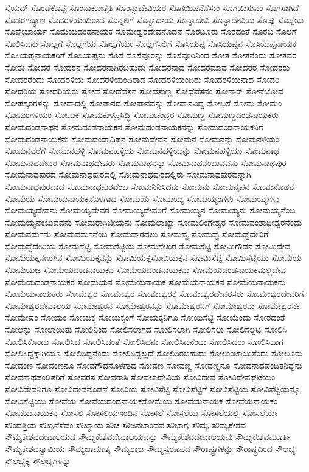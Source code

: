 {ಸೈಯದ್
ಸೊಂಡೆಕೊಪ್ಪ
ಸೊಂನಾಕೋತ್ಸತಿ
ಸೊಂನ್ನಾದೇವಿಯರ
ಸೊಗಯಿಪನೆನೆಸುಂ
ಸೊಗಯಿಸುವಂ
ಸೊಗಸಾಗಿದೆ
ಸೊಡರಗದ್ಯಾಣ
ಸೊದರಳಿಯಂದಿರಾದ
ಸೊನ್ನಲಿಗೆ
ಸೊನ್ನಾದಾಯ
ಸೊನ್ನಾದೇವಿ
ಸೊನ್ನಾದೇವಿಯ
ಸೊಪ್ಪು
ಸೊಪ್ಪೆಯ
ಸೊಪ್ಪೆಯಾರ್ಯ
ಸೊಮೆಯದಂಡನಾಯಕ
ಸೊಮೇಶ್ವರದೇವನೊಡನೆ
ಸೊರಟೂರು
ಸೊರದಂತೆ
ಸೊರಬ
ಸೊಲಗೆ
ಸೊಲಿಸಿದನು
ಸೊಲ್ಲಗೆ
ಸೊಲ್ಲಗೆಯ
ಸೊಲ್ಲಗೆಯೇ
ಸೊಲ್ಲಗೆಸಲಿಗೆ
ಸೊಸಿಯಪ್ಪ
ಸೊಸಿಯಪ್ಪನ
ಸೊಸಿಯಪ್ಪನಾಯಕ
ಸೊಸಿಯಪ್ಪನಾಯಕರಿಗೆ
ಸೊಸಿಯಪ್ಪನು
ಸೊಸೆ
ಸೊಸೆವೂರನ್ನು
ಸೊಸೆವೂರಿನಿಂದ
ಸೋತ
ಸೋತನೆಂದು
ಸೋತವರ
ಸೋತು
ಸೋದರ
ಸೋದರನ
ಸೋದರನಾಗಿರಬಹುದು
ಸೋದರನಾದ
ಸೋದರಮಾವ
ಸೋದರರ
ಸೋದರರು
ಸೋದರರೆಂದು
ಸೋದರಳಿಯ
ಸೋದರಳಿಯಂದಿರಾದ
ಸೋದರಳಿಯಂದಿರು
ಸೋದರಳಿಯನಾದ
ಸೋದರಿ
ಸೋದರಿಯ
ಸೋದರಿಯರು
ಸೋದೆ
ಸೋದೆವೆಸನ
ಸೋದೆಸುಣ್ಣ
ಸೋಧೆವೆಸನಂ
ಸೋನಾರ್
ಸೋನೆಬೋವ
ಸೋಪಸ್ಕರಗಳನ್ನು
ಸೋಪಾದಲ್ಲಿ
ಸೋಪಾನದ
ಸೋಪಾನವನ್ನು
ಸೋಪಾನವಿದ್ದ
ಸೋಭಿಸೆ
ಸೋಮ
ಸೋಮಂ
ಸೋಮಂಗಳಿಯಂ
ಸೋಮಕ
ಸೋಮಕುಳಪ್ರಸಿದ್ಧಿ
ಸೋಮಚಂದ್ರರ
ಸೋಮಣ್ಣ
ಸೋಮಣ್ಣದಂಡನಾಯಕರು
ಸೋಮದಂಡನಾಥನ
ಸೋಮದಂಡನಾಯಕನ
ಸೋಮದಂಡನಾಯಕನನ್ನು
ಸೋಮದಂಡನಾಯಕನಿಗೆ
ಸೋಮದಂಡನಾಯಕನು
ಸೋಮದಂಡಾಧಿಪನ
ಸೋಮದೇವನ
ಸೋಮನ
ಸೋಮನನ್ನು
ಸೋಮನಳಿಯಂ
ಸೋಮನವರೆಗೆ
ಸೋಮನಹಳ್ಳಿ
ಸೋಮನಹಳ್ಳಿಯ
ಸೋಮನಹಳ್ಳಿಯನ್ನು
ಸೋಮನಹಳ್ಳಿಯು
ಸೋಮನಾಥ
ಸೋಮನಾಥದೇವರ
ಸೋಮನಾಥದೇವರು
ಸೋಮನಾಥನನ್ನು
ಸೋಮನಾಥನೆಂಬುವವನು
ಸೋಮನಾಥಪುರ
ಸೋಮನಾಥಪುರದ
ಸೋಮನಾಥಪುರದಲ್ಲಿ
ಸೋಮನಾಥಪುರದಲ್ಲಿರು
ಸೋಮನಾಥಪುರವನ್ನಾಗಿ
ಸೋಮನಾಥಪುರವಾದ
ಸೋಮನಾಥಪುರವೆಂಬ
ಸೋಮನಿನಿಸಿದನು
ಸೋಮನು
ಸೋಮನೃಪನ
ಸೋಮನೊಡನೆ
ಸೋಮಯ
ಸೋಮಯನಾಯಕನೊಳಗಾದ
ಸೋಮಯೆ
ಸೋಮಯ್ಯ
ಸೋಮಯ್ಯಂಗಳು
ಸೋಮಯ್ಯಗಳು
ಸೋಮಯ್ಯದೇವನು
ಸೋಮಯ್ಯದೇವರ
ಸೋಮಯ್ಯದೇವರಿಗೆ
ಸೋಮಯ್ಯನ
ಸೋಮಯ್ಯನು
ಸೋಮಯ್ಯನೆಂಬ
ಸೋಮಯ್ಯನೆಂಬುವವನು
ಸೋಮರಾಸಿಜೀಯನು
ಸೋಮಲಾಖ್ಯಾ
ಸೋಮಲಿಂಗೇಶ್ವರ
ಸೋಮವಂಶಾಧೀಶ್ವರನೆಂದು
ಸೋಮವರ್ಮನು
ಸೋಮವರ್ಮನೆಂಬ
ಸೋಮವಾರದಲು
ಸೋಮವ್ವ
ಸೋಮವ್ವೆ
ಸೋಮವ್ವೆದೇವಿಗೆ
ಸೋಮವ್ವೆದೇವಿಯ
ಸೋಮಶೆಟ್ಟಿ
ಸೋಮಶೆಟ್ಟಿಯ
ಸೋಮಶೇಖರ
ಸೋಮಸೆಟ್ಟಿ
ಸೋಮಿಗೌಡನ
ಸೋಮಿದೇವ
ಸೋಮಿಯಕ್ಕನಣುಗಿನ
ಸೋಮಿಯಕ್ಕನನ್ನು
ಸೋಮಿಯಕ್ಕಸೋವಿಯಕ್ಕನ
ಸೋಮಿಸೆಟ್ಟಿ
ಸೋಮಿಸೆಟ್ಟಿಯು
ಸೋಮೆಯ
ಸೋಮೆಯಜ
ಸೋಮೆಯದಂಡನಾಯಕನ
ಸೋಮೆಯದಂಡನಾಯಕನು
ಸೋಮೆಯದಂಡನಾಯಕಮಲ್ಲಿದೇವ
ಸೋಮೆಯದಂಡನಾಯಕರ
ಸೋಮೆಯನ
ಸೋಮೆಯನಾಯಕ
ಸೋಮೆಯನಾಯಕನ
ಸೋಮೆಯನಾಯಕನು
ಸೋಮೆಯನಾಯಕರು
ಸೋಮೆಶ್ವರ
ಸೋಮೇಶ್ವರ
ಸೋಮೇಶ್ವರಕ್ಕೆ
ಸೋಮೇಶ್ವರದೇವರಸರು
ಸೋಮೇಶ್ವರದೇವರಿಗೆ
ಸೋಮೇಶ್ವರದೇವಾಲಯ
ಸೋಮೇಶ್ವರನ
ಸೋಮೇಶ್ವರನನ್ನು
ಸೋಮೇಶ್ವರನಿಗೆ
ಸೋಮೇಶ್ವರನು
ಸೋಮೇಶ್ವರನೇ
ಸೋಮೇಷಂ
ಸೋಯಂ
ಸೋಯಕ್ಕ
ಸೋಯಕ್ಕಂಗೆ
ಸೋಯಕ್ಕನಿಗೂ
ಸೋಯಿಸೆಟ್ಟಿ
ಸೋಯೆಂದು
ಸೋರದಂತೆ
ಸೋಲನ್ನು
ಸೋಲಾಯಿತು
ಸೋಲಿನಿಂದ
ಸೋಲಿಸಲಾಗದ
ಸೋಲಿಸಲಾಗಿ
ಸೋಲಿಸಲು
ಸೋಲಿಸಲ್ಪಟ್ಟ
ಸೋಲಿಸಿ
ಸೋಲಿಸಿಕೊಂದು
ಸೋಲಿಸಿದ
ಸೋಲಿಸಿದಂತೆ
ಸೋಲಿಸಿದನು
ಸೋಲಿಸಿದನೆಂದು
ಸೋಲಿಸಿದರು
ಸೋಲಿಸಿದಾಗ
ಸೋಲಿಸಿದ್ದಕ್ಕಾಗಿಯೂ
ಸೋಲಿಸಿದ್ದನೆಂದು
ಸೋಲಿಸಿದ್ದಲ್ಲದೆ
ಸೋಲಿಸಿರಬಹುದು
ಸೋಲುಂಟಾಯಿತೆಂದು
ಸೋಲೂರು
ಸೋವಂಣ
ಸೋವಂಣನೂ
ಸೋವಗೌಡನೊಳಗಾದ
ಸೋವಣ
ಸೋವಣ್ಣ
ಸೋವಣ್ಣನೂ
ಸೋವನಾಥಪಂಡಿತನಿದ್ದನು
ಸೋವನಾಥಪಂಡಿತರಿಗೆ
ಸೋವರಸ
ಸೋವರಾಸಿ
ಸೋವಲಾದೇವಿಯ
ಸೋವಿದೇವ
ಸೋವಿದೇವಘಟೆಯಂ
ಸೋವಿದೇವನಿಗೂ
ಸೋವಿದೇವನೊಡನೆ
ಸೋವಿಯ
ಸೋವಿಸೆಟ್ಟಿ
ಸೋವಿಸೆಟ್ಟಿಗೆ
ಸೋವಿಸೆಟ್ಟಿಯ
ಸೋವಿಸೆಟ್ಟಿಯನ್ನೂ
ಸೋವಿಸೆಟ್ಟಿಯು
ಸೋವೆಯ
ಸೋವೆಯದಂಡನಾಯಕಸೋಮೆಯ
ಸೋವೆಯನಾಯಕ
ಸೋವೆಯನಾಯಕಂ
ಸೋವೆಯನಾಯಕನ
ಸೋಸಲಿ
ಸೋಸಲಿಯಇಂದಿನ
ಸೋಸಲೆ
ಸೋಸಲೆಯ
ಸೋಸಲೆಯಲ್ಲಿ
ಸೋಸಲೆಯೇ
ಸೌಂದತ್ತಿಯ
ಸೌಖ್ಯನೆಸೆವಂ
ಸೌಖ್ಯಾಯ
ಸೌಚ
ಸೌಜನಬಾಂಧವ
ಸೌಭಾಗ್ಯ
ಸೌಮ್ಯ
ಸೌಮ್ಯಕೇಶವ
ಸೌಮ್ಯಕೇಶವದೇವಾಲಯದ
ಸೌಮ್ಯಕೇಶವದೇವಾಲಯವನ್ನು
ಸೌಮ್ಯಕೇಶವದೇವಾಲಯವು
ಸೌಮ್ಯಕೇಶವಮೂರ್ತಿ
ಸೌಮ್ಯಕೇಶವಸ್ವಾಮಿಯ
ಸೌಮ್ಯಜಾಮಾತೃ
ಸೌಮ್ಯರಾಜ
ಸೌಮ್ಯಸ್ವರೂಪದ
ಸೌರಾಷ್ಟ್ರಗಳನ್ನು
ಸೌರಾಷ್ಟ್ರದಿಂದ
ಸೌಲಭ್ಯ
ಸೌಲಭ್ಯಕ್ಕೆ
ಸೌಲಭ್ಯಗಳನ್ನು
}
